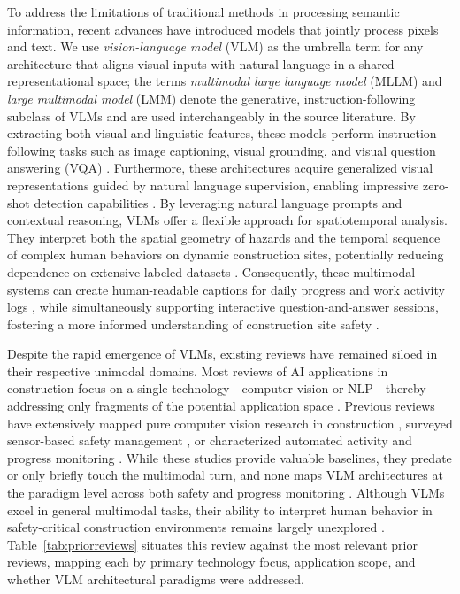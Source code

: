 \documentclass[10pt,letterpaper]{article}
\begin{document}
To address the limitations of traditional methods in processing semantic information, recent advances have introduced models that jointly process pixels and text. We use \textit{vision-language model} (VLM) as the umbrella term for any architecture that aligns visual inputs with natural language in a shared representational space; the terms \textit{multimodal large language model} (MLLM) and \textit{large multimodal model} (LMM) denote the generative, instruction-following subclass of VLMs and are used interchangeably in the source literature. By extracting both visual and linguistic features, these models perform instruction-following tasks such as image captioning, visual grounding, and visual question answering (VQA) \cite{chan2025}. Furthermore, these architectures acquire generalized visual representations guided by natural language supervision, enabling impressive zero-shot detection capabilities \cite{zhang2025}. By leveraging natural language prompts and contextual reasoning, VLMs offer a flexible approach for spatiotemporal analysis. They interpret both the spatial geometry of hazards and the temporal sequence of complex human behaviors on dynamic construction sites, potentially reducing dependence on extensive labeled datasets \cite{bui2026}. Consequently, these multimodal systems can create human-readable captions for daily progress and work activity logs \cite{jung2024}, while simultaneously supporting interactive question-and-answer sessions, fostering a more informed understanding of construction site safety \cite{hussain2026}.

Despite the rapid emergence of VLMs, existing reviews have remained siloed in their respective unimodal domains. Most reviews of AI applications in construction focus on a single technology---computer vision or NLP---thereby addressing only fragments of the potential application space \cite{rabbi2024}. Previous reviews have extensively mapped pure computer vision research in construction \cite{jiang2023,paneru2021,zhong2019}, surveyed sensor-based safety management \cite{asadzadeh2020}, or characterized automated activity and progress monitoring \cite{sherafat2020,samsami2024}. While these studies provide valuable baselines, they predate or only briefly touch the multimodal turn, and none maps VLM architectures at the paradigm level across both safety and progress monitoring \cite{zhang2025}. Although VLMs excel in general multimodal tasks, their ability to interpret human behavior in safety-critical construction environments remains largely unexplored \cite{bui2026}. Table~\ref{tab:priorreviews} situates this review against the most relevant prior reviews, mapping each by primary technology focus, application scope, and whether VLM architectural paradigms were addressed.
\end{document}

